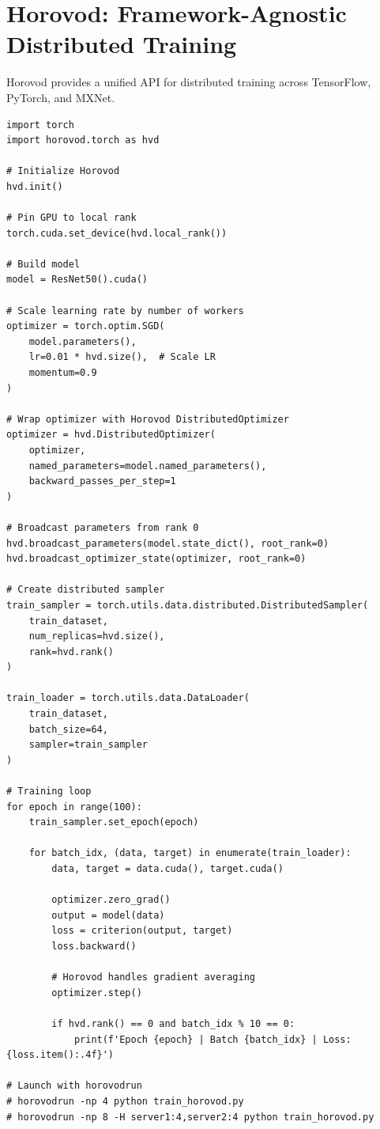 \section{Horovod: Framework-Agnostic Distributed Training}

Horovod provides a unified API for distributed training across TensorFlow, PyTorch, and MXNet.

\begin{lstlisting}[style=python, caption=Horovod distributed training]
import torch
import horovod.torch as hvd

# Initialize Horovod
hvd.init()

# Pin GPU to local rank
torch.cuda.set_device(hvd.local_rank())

# Build model
model = ResNet50().cuda()

# Scale learning rate by number of workers
optimizer = torch.optim.SGD(
    model.parameters(),
    lr=0.01 * hvd.size(),  # Scale LR
    momentum=0.9
)

# Wrap optimizer with Horovod DistributedOptimizer
optimizer = hvd.DistributedOptimizer(
    optimizer,
    named_parameters=model.named_parameters(),
    backward_passes_per_step=1
)

# Broadcast parameters from rank 0
hvd.broadcast_parameters(model.state_dict(), root_rank=0)
hvd.broadcast_optimizer_state(optimizer, root_rank=0)

# Create distributed sampler
train_sampler = torch.utils.data.distributed.DistributedSampler(
    train_dataset,
    num_replicas=hvd.size(),
    rank=hvd.rank()
)

train_loader = torch.utils.data.DataLoader(
    train_dataset,
    batch_size=64,
    sampler=train_sampler
)

# Training loop
for epoch in range(100):
    train_sampler.set_epoch(epoch)

    for batch_idx, (data, target) in enumerate(train_loader):
        data, target = data.cuda(), target.cuda()

        optimizer.zero_grad()
        output = model(data)
        loss = criterion(output, target)
        loss.backward()

        # Horovod handles gradient averaging
        optimizer.step()

        if hvd.rank() == 0 and batch_idx % 10 == 0:
            print(f'Epoch {epoch} | Batch {batch_idx} | Loss: {loss.item():.4f}')

# Launch with horovodrun
# horovodrun -np 4 python train_horovod.py
# horovodrun -np 8 -H server1:4,server2:4 python train_horovod.py
\end{lstlisting}

